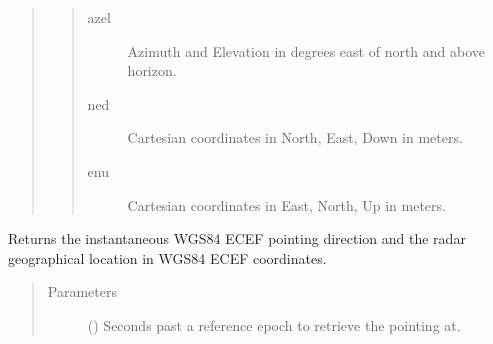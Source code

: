 \documentclass[letterpaper,10pt,english]{sphinxmanual}
\begin{document}
\begin{fulllineitems}
\begin{sphinxVerbatim}[commandchars=\\\{\}]
   
            
          
          
          
           
\end{sphinxVerbatim}

\begin{quote}
\begin{quote}\begin{description}
\item[{azel}] \leavevmode
Azimuth and Elevation in degrees east of north and above horizon.

\item[{ned}] \leavevmode
Cartesian coordinates in North, East, Down in meters.

\item[{enu}] \leavevmode
Cartesian coordinates in East, North, Up in meters.

\end{description}\end{quote}
\end{quote}

\begin{fulllineitems}
\label{\detokenize{modules/radar_scans:radar_scans.RadarScan.antenna_pointing}}
Returns the instantaneous WGS84 ECEF pointing direction and the radar geographical location in WGS84 ECEF coordinates.
\begin{quote}\begin{description}
\item[{Parameters}] \leavevmode
{} () \textendash{} Seconds past a reference epoch to retrieve the pointing at.


\end{description}
\end{quote}
\end{fulllineitems}
\end{fulllineitems}
\end{document}
